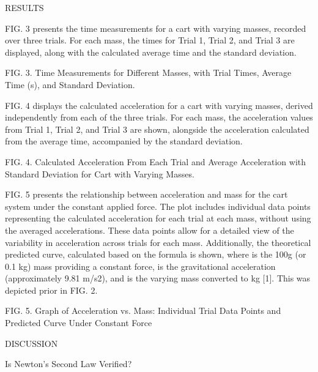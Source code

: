 RESULTS


FIG. 3 presents the time measurements for a cart with varying masses, recorded over three trials. For each mass, the times for Trial 1, Trial 2, and Trial 3 are displayed, along with the calculated average time and the standard deviation. 


  

FIG. 3. Time Measurements for Different Masses, with Trial Times, Average Time (s), and Standard Deviation.


FIG. 4 displays the calculated acceleration for a cart with varying masses, derived independently from each of the three trials. For each mass, the acceleration values from Trial 1, Trial 2, and Trial 3 are shown, alongside the acceleration calculated from the average time, accompanied by the standard deviation. 


  

FIG. 4. Calculated Acceleration From Each Trial and Average Acceleration with Standard Deviation for Cart with Varying Masses.


FIG. 5 presents the relationship between acceleration and mass for the cart system under the constant applied force. The plot includes individual data points representing the calculated acceleration for each trial at each mass, without using the averaged accelerations. These data points allow for a detailed view of the variability in acceleration across trials for each mass. Additionally, the theoretical predicted curve, calculated based on the formula  is shown, where  is the 100g (or 0.1 kg) mass providing a constant force,  is the gravitational acceleration (approximately 9.81 m/s2), and  is the varying mass converted to kg [1]. This was depicted prior in FIG. 2.




  

FIG. 5. Graph of Acceleration vs. Mass: Individual Trial Data Points and Predicted Curve Under Constant Force


DISCUSSION


Is Newton’s Second Law Verified?


